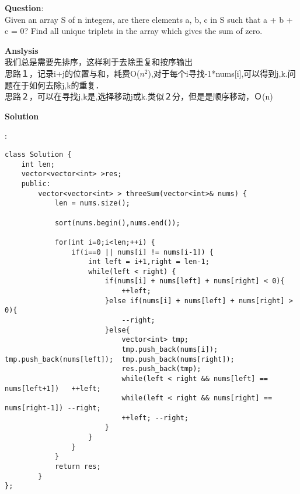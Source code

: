     
\begin{description}
    \item{\textbf{Question}}:\\%
		Given an array S of n integers, are there elements a, b, c in S such that a + b + c = 0? Find all unique triplets in the array which gives the sum of zero.\\

    \item{\textbf{Anslysis}}\\
		我们总是需要先排序，这样利于去除重复和按序输出\\
		思路１，记录i+j的位置与和，耗费O($n^2$),对于每个i寻找-1*nums[i],可以得到j,k.问题在于如何去除j,k的重复．\\
		思路２，可以在寻找j,k是,选择移动j或k.类似２分，但是是顺序移动，Ｏ(n)\\

    \item{\textbf{Solution}}\\
	\item{} : \\
		\begin{lstlisting}
class Solution {
	int len;
	vector<vector<int> >res;
	public:
		vector<vector<int> > threeSum(vector<int>& nums) {
			len = nums.size();

			sort(nums.begin(),nums.end());

			for(int i=0;i<len;++i) {
				if(i==0 || nums[i] != nums[i-1]) {
					int left = i+1,right = len-1;
					while(left < right) {
						if(nums[i] + nums[left] + nums[right] < 0){
							++left;
						}else if(nums[i] + nums[left] + nums[right] > 0){
							--right;
						}else{
							vector<int> tmp;
							tmp.push_back(nums[i]);	tmp.push_back(nums[left]);	tmp.push_back(nums[right]);	
							res.push_back(tmp);
							while(left < right && nums[left] == nums[left+1])	++left;
							while(left < right && nums[right] == nums[right-1])	--right;
							++left; --right;
						}
					}
				}
			}
			return res;
		}
};
		\end{lstlisting}

\end{description}

